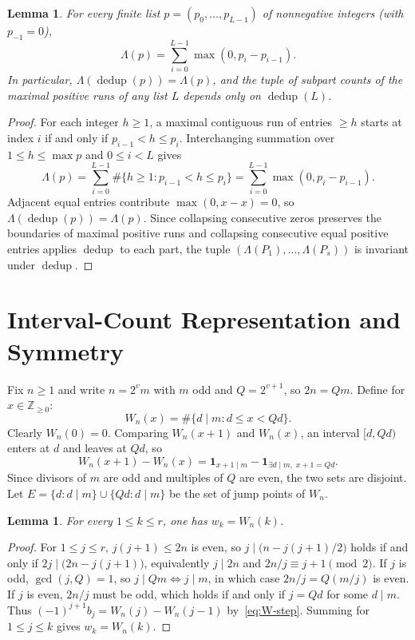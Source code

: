 \documentclass[11pt]{article}
\newtheorem{lemma}[theorem]{Lemma}
\begin{document}
\begin{lemma}\label{lem:rise}
For every finite list $p = (p_0, \dots, p_{L-1})$ of nonnegative integers (with $p_{-1} = 0$),
\[
  \Lambda(p) = \sum_{i = 0}^{L - 1} \max(0, p_i - p_{i-1}).
\]
In particular, $\Lambda(\operatorname{dedup}(p)) = \Lambda(p)$, and the tuple of subpart counts of the maximal positive runs of any list $L$ depends only on $\operatorname{dedup}(L)$.
\end{lemma}

\begin{proof}
For each integer $h \ge 1$, a maximal contiguous run of entries $\ge h$ starts at index $i$ if and only if $p_{i-1} < h \le p_i$. Interchanging summation over $1 \le h \le \max p$ and $0 \le i < L$ gives
\[
  \Lambda(p) = \sum_{i = 0}^{L - 1} \#\{h \ge 1 : p_{i-1} < h \le p_i\} = \sum_{i = 0}^{L - 1} \max(0, p_i - p_{i-1}).
\]
Adjacent equal entries contribute $\max(0, x - x) = 0$, so $\Lambda(\operatorname{dedup}(p)) = \Lambda(p)$. Since collapsing consecutive zeros preserves the boundaries of maximal positive runs and collapsing consecutive equal positive entries applies $\operatorname{dedup}$ to each part, the tuple $(\Lambda(P_1), \dots, \Lambda(P_s))$ is invariant under $\operatorname{dedup}$.
\end{proof}

\section{Interval-Count Representation and Symmetry}

Fix $n \ge 1$ and write $n = 2^v m$ with $m$ odd and $Q = 2^{v+1}$, so $2n = Qm$. Define for $x \in \mathbb{Z}_{\ge 0}$:
\[
  W_n(x) = \#\{d \mid m : d \le x < Q d\}.
\]
Clearly $W_n(0) = 0$. Comparing $W_n(x+1)$ and $W_n(x)$, an interval $[d, Qd)$ enters at $d$ and leaves at $Qd$, so
\begin{equation}\label{eq:W-step}
  W_n(x+1) - W_n(x) = \mathbf{1}_{x+1 \mid m} - \mathbf{1}_{\exists d \mid m,\; x+1 = Qd}.
\end{equation}
Since divisors of $m$ are odd and multiples of $Q$ are even, the two sets are disjoint. Let $E = \{d : d \mid m\} \cup \{Qd : d \mid m\}$ be the set of jump points of $W_n$.

\begin{lemma}\label{lem:match}
For every $1 \le k \le r$, one has $w_k = W_n(k)$.
\end{lemma}

\begin{proof}
For $1 \le j \le r$, $j(j+1) \le 2n$ is even, so $j \mid \bigl(n - j(j+1)/2\bigr)$ holds if and only if $2j \mid \bigl(2n - j(j+1)\bigr)$, equivalently $j \mid 2n$ and $2n/j \equiv j + 1 \pmod 2$. If $j$ is odd, $\gcd(j, Q) = 1$, so $j \mid Qm \iff j \mid m$, in which case $2n/j = Q(m/j)$ is even. If $j$ is even, $2n/j$ must be odd, which holds if and only if $j = Qd$ for some $d \mid m$. Thus $(-1)^{j+1} b_j = W_n(j) - W_n(j-1)$ by~\eqref{eq:W-step}. Summing for $1 \le j \le k$ gives $w_k = W_n(k)$.
\end{proof}
\end{document}
